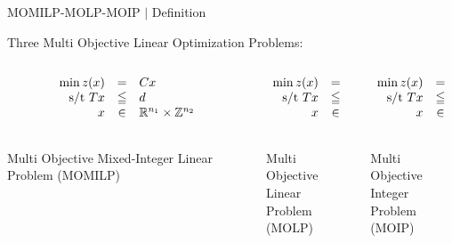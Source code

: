 \documentclass[10pt,xcolor=dvipsnames]{beamer}
\newcommand{\mR}{\mathbb{R}}
\newcommand{\mZ}{\mathbb{Z}}
\begin{document}
%
% 
\begin{frame}{MOMILP-MOLP-MOIP $\mid$ Definition}

\hspace{-4mm}
Three Multi Objective Linear Optimization Problems:


\begin{columns}
\begin{column}{0.33\textwidth}
$$
\begin{array}{rcl}
\min z(x) & = & {C}x\\
\hbox{s/t } Tx & \leqq & d\\
x & \in & 
\mR^{n_1} \times \mZ^{n_2}\\
\notag
\end{array}
$$
\begin{center}
Multi Objective Mixed-Integer Linear Problem (MOMILP)
\end{center}
\end{column}
\begin{column}{0.33\textwidth}
$$
\begin{array}{rcl}
\min z(x) & = & {C}x\\
\hbox{s/t } Tx & \leqq & d\\
x & \in & 
\mR^{n_1}\\
\notag
\end{array}
$$
\begin{center}
Multi Objective\\ Linear \\Problem (MOLP)
\end{center}
\end{column}
\begin{column}{0.33\textwidth}
$$
\begin{array}{rcl}
\min z(x) & = & {C}x\\
\hbox{s/t } Tx & \leqq & d\\
x & \in & 
\mZ^{n_2}\\
\notag
\end{array}
$$
\begin{center}
Multi Objective\\ Integer \\Problem (MOIP)
\end{center}
\end{column}
\end{columns}
\medskip


\end{frame}
\end{document}

